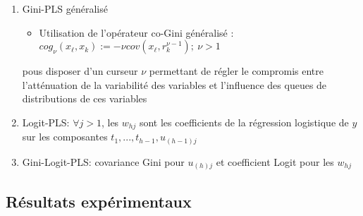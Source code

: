 \begin{frame}[t]{\mysubsectiontitle}
\begin{enumerate}
\setlength\itemsep{1.5em}

\item Gini-PLS généralisé
\begin{itemize}
	\item Utilisation de l'opérateur co-Gini généralisé : $cog_\nu(x_\ell,x_k) := -\nu cov(x_\ell,r_{k}^{\nu-1}) ; \ \nu > 1$
\end{itemize}
 pous disposer d'un curseur $\nu$ permettant de régler le compromis entre l'atténuation de la variabilité des variables et l'influence des queues de distributions de ces variables

\item Logit-PLS:  $\forall j > 1$, les $w_{hj} $ sont les coefficients de la régression logistique de $y$ sur les composantes $t_1, ..., t_{h-1}, u_{(h-1)j}$ \cite{tenenhaus2005logitpls}

\item Gini-Logit-PLS: covariance Gini pour $u_{(h)j}$ et coefficient Logit pour les $w_{hj}$
\end{enumerate}
\end{frame}


\subsection{Résultats expérimentaux}

